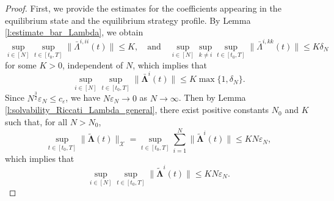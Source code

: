 \documentclass[10pt,a4paper]{amsart}
\def\wt{\widetilde}
\begin{document}
\begin{proof}
First, we provide the estimates for the coefficients appearing in the equilibrium state and the equilibrium strategy profile. By Lemma \ref{l:estimate_bar_Lambda}, we obtain
$$\sup_{i \in [N]} \sup_{t \in [t_0, T]} \|\bar{\Lambda}^{i,ii}(t)\| \leq K, \quad \text{and} \quad \sup_{i \in [N]} \sup_{k \neq i} \sup_{t \in [t_0, T]} \|\bar{\Lambda}^{i,kk}(t)\| \leq K \delta_N$$
for some $K > 0$, independent of $N$, which implies that
$$\sup_{i \in [N]} \sup_{t \in [t_0, T]} \|\bar{\bm{\Lambda}}^i(t)\| \leq K \max\{1, \delta_N\}.$$
Since $N^{\frac{3}{2}} \varepsilon_N \leq c_{\varepsilon}$, we have $N \varepsilon_N \to 0$ as $N \to \infty$. Then by Lemma \ref{l:solvability_Riccati_Lambda_general}, there exist positive constants $N_0$ and $K$ such that, for all $N > N_0$,
$$\sup_{t \in [t_0, T]} \|\wt{\bm{\Lambda}}(t)\|_{\mathcal{X}} = \sup_{t \in [t_0, T]} \sum_{i=1}^N \|\wt{\bm{\Lambda}}^i(t)\| \leq KN \varepsilon_N,$$
which implies that
$$\sup_{i \in [N]} \sup_{t \in [t_0, T]} \|\wt{\bm{\Lambda}}^i(t)\| \leq KN \varepsilon_N.$$


\end{proof}
\end{document}
